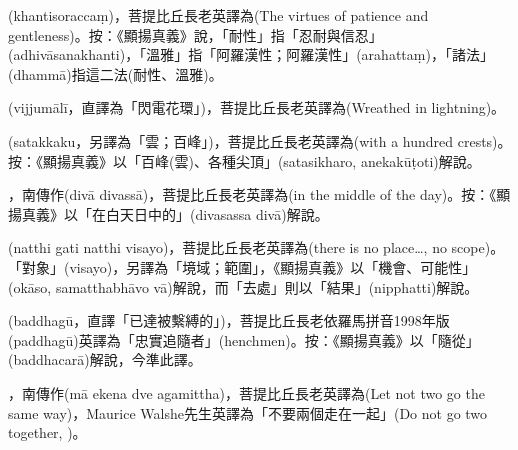 \startitemgroup[noteitems]
\item{}(khantisoraccaṃ)，菩提比丘長老英譯為(The virtues of patience and gentleness)。按：《顯揚真義》說，「耐性」指「忍耐與信忍」(adhivāsanakhanti)，「溫雅」指「阿羅漢性；阿羅漢性」(arahattaṃ)，「諸法」(dhammā)指這二法(耐性、溫雅)。
\stopitemgroup

\startitemgroup[noteitems]
\item{}(vijjumālī，直譯為「閃電花環」)，菩提比丘長老英譯為(Wreathed in lightning)。
\stopitemgroup

\startitemgroup[noteitems]
\item{}(satakkaku，另譯為「雲；百峰」)，菩提比丘長老英譯為(with a hundred crests)。按：《顯揚真義》以「百峰(雲)、各種尖頂」(satasikharo, anekakūṭoti)解說。
\stopitemgroup

\startitemgroup[noteitems]
\item{}，南傳作(divā divassā)，菩提比丘長老英譯為(in the middle of the day)。按：《顯揚真義》以「在白天日中的」(divasassa divā)解說。
\stopitemgroup

\startitemgroup[noteitems]
\item{}(natthi gati natthi visayo)，菩提比丘長老英譯為(there is no place…, no scope)。「對象」(visayo)，另譯為「境域；範圍」，《顯揚真義》以「機會、可能性」(okāso, samatthabhāvo vā)解說，而「去處」則以「結果」(nipphatti)解說。
\stopitemgroup

\startitemgroup[noteitems]
\item{}(baddhagū，直譯「已達被繫縛的」)，菩提比丘長老依羅馬拼音1998年版(paddhagū)英譯為「忠實追隨者」(henchmen)。按：《顯揚真義》以「隨從」(baddhacarā)解說，今準此譯。
\stopitemgroup

\startitemgroup[noteitems]
\item{}，南傳作(mā ekena dve agamittha)，菩提比丘長老英譯為(Let not two go the same way)，Maurice Walshe先生英譯為「不要兩個走在一起」(Do not go two together, )。
\stopitemgroup

